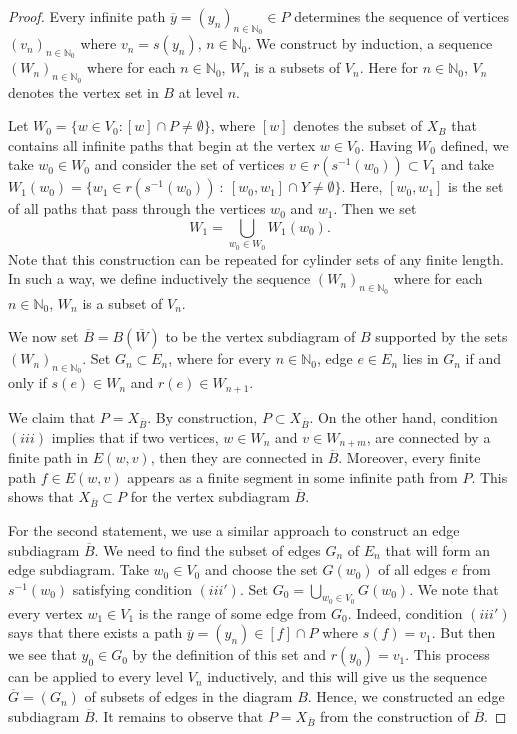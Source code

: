 \documentclass[11pt,reqno]{amsart}
\theoremstyle{definition}
\theoremstyle{remark}
\theoremstyle{plain}
\def\ol{\overline}
\newcommand{\N}{\mathbb N}
\numberwithin{equation}{section}
\begin{document}
\begin{proof}
Every infinite path $\ol y = (y_n)_{n \in \N_0}\in P$ determines the sequence of vertices
$(v_n)_{n \in \N_0}$ where $v_n = s(y_n)$, $n \in \N_0$. We construct by induction, a sequence $(W_n)_{n \in \N_0}$ where for each $n \in \N_0$, $W_n$ is a subsets of $V_n$. Here for $n \in \N_0$, $V_n$ denotes the vertex set in $B$ at level $n$.  

Let $W_0 = \{w \in V_0 : [w] \cap P \neq \emptyset\}$, where $[w]$ denotes the subset of $X_B$ that contains all infinite paths that begin at the vertex $w \in V_0$. Having $W_0$ defined, we take $w_0 \in W_0$ and consider the set
of vertices $v\in r(s^{-1}(w_0)) \subset V_1$ and take $W_1(w_0) = \{w_1 \in r(s^{-1}(w_0)) \ :\ [w_0, w_1] \cap Y \neq \emptyset\}$. Here, $[w_0, w_1]$ is the set of all paths that pass through the vertices $ w_0$ and $ w_1$. Then we set 
$$
W_1 = \bigcup_{w_0 \in W_0}W_1(w_0).
$$
Note that this construction can be repeated for cylinder sets of any finite length. In such a way, we define inductively the sequence $(W_n)_{n \in \N_0}$ where for each $n \in \N_0$, $W_n$ is a subset of $V_n$. 

We now set $\ol B= B(\ol W)$ to be the vertex subdiagram of $B$ supported by the sets $(W_n)_{n \in \N_0}$. 
Set $ G_n \subset E_n$, where for every $n\in \N_0$, edge $e \in E_n$ lies in $G_n$ if and only if $s(e) \in W_{n}$ and $r(e) \in W_{n+1}$.

We claim that $P = X_{\ol B}$. By construction, 
$P \subset X_{\ol B}$. On the other hand, condition $(iii)$ implies that
if two vertices, $w \in W_n$ and  $v \in W_{n+m}$, are connected by a finite path in $E(w, v)$, then they are connected in $\ol B$. Moreover, every finite path $f \in E(w, v)$ appears as a finite segment in some infinite path from $P$. This shows that $X_{\ol B} \subset P$ for the vertex subdiagram $\ol B$. 

For the second statement, we use a similar approach to construct an 
edge subdiagram $\ol B$. We need to find the subset of edges $G_n$ of $E_n$ that will form an edge subdiagram. Take $w_0 \in V_0$ and choose the set $G(w_0)$ of all edges $e$ from $s^{-1}(w_0)$ satisfying condition $(iii')$. Set $G_0 = \bigcup_{w_0 \in V_0} G(w_0)$. We note that every vertex $w_1 \in V_1$ is the range of some edge from
$G_0$. Indeed, condition $(iii')$ says that there exists a path  $ \ol y = (y_n) \in [f] \cap P$ where $s(f) = v_1$. But then we see that $y_0 \in G_0$ by the definition of this set and $r(y_0) = v_1$. 
This process can be applied to every level $V_n$ inductively, and this will give us the sequence $\ol G = ( G_n)$ of subsets of edges in the diagram $B$. 
Hence, we constructed an edge subdiagram $\ol B$. It remains to observe that $P = X_{\ol B}$ from the construction of $\ol B$. 

\end{proof}
\end{document}

